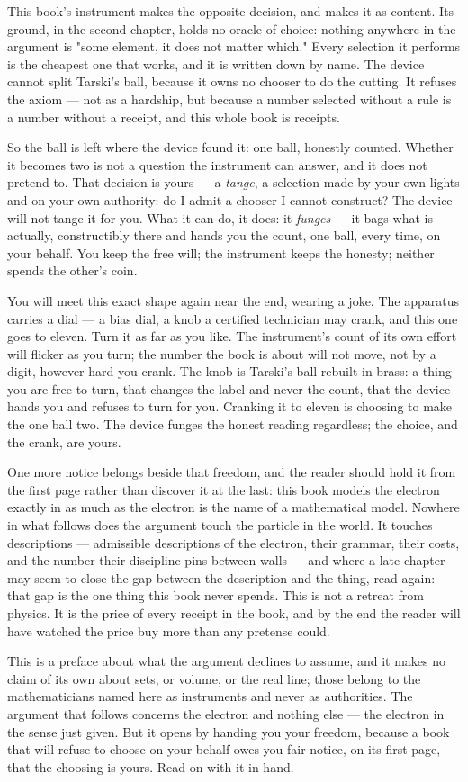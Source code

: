 This book's instrument makes the opposite decision, and makes it as content. Its
ground, in the second chapter, holds no oracle of choice: nothing anywhere in
the argument is "some element, it does not matter which." Every selection it
performs is the cheapest one that works, and it is written down by name. The
device cannot split Tarski's ball, because it owns no chooser to do the cutting.
It refuses the axiom --- not as a hardship, but because a number selected without
a rule is a number without a receipt, and this whole book is receipts.

So the ball is left where the device found it: one ball, honestly counted.
Whether it becomes two is not a question the instrument can answer, and it does
not pretend to. That decision is yours --- a \emph{tange}, a selection made by
your own lights and on your own authority: do I admit a chooser I cannot
construct? The device will not tange it for you. What it can do, it does: it
\emph{funges} --- it bags what is actually, constructibly there and hands you the
count, one ball, every time, on your behalf. You keep the free will; the
instrument keeps the honesty; neither spends the other's coin.

You will meet this exact shape again near the end, wearing a joke. The apparatus
carries a dial --- a bias dial, a knob a certified technician may crank, and this
one goes to eleven. Turn it as far as you like. The instrument's count of its own
effort will flicker as you turn; the number the book is about will not move, not
by a digit, however hard you crank. The knob is Tarski's ball rebuilt in brass:
a thing you are free to turn, that changes the label and never the count, that
the device hands you and refuses to turn for you. Cranking it to eleven is
choosing to make the one ball two. The device funges the honest reading
regardless; the choice, and the crank, are yours.

One more notice belongs beside that freedom, and the reader should hold it from
the first page rather than discover it at the last: this book models the
electron exactly in as much as the electron is the name of a mathematical
model. Nowhere in what follows does the argument touch the particle in the
world. It touches descriptions --- admissible descriptions of the electron,
their grammar, their costs, and the number their discipline pins between walls
--- and where a late chapter may seem to close the gap between the description
and the thing, read again: that gap is the one thing this book never spends.
This is not a retreat from physics. It is the price of every receipt in the
book, and by the end the reader will have watched the price buy more than any
pretense could.

This is a preface about what the argument declines to assume, and it makes no
claim of its own about sets, or volume, or the real line; those belong to the
mathematicians named here as instruments and never as authorities. The argument
that follows concerns the electron and nothing else --- the electron in the
sense just given. But it opens by handing you your freedom, because a book that
will refuse to choose on your behalf owes you fair notice, on its first page,
that the choosing is yours. Read on with it in hand.
